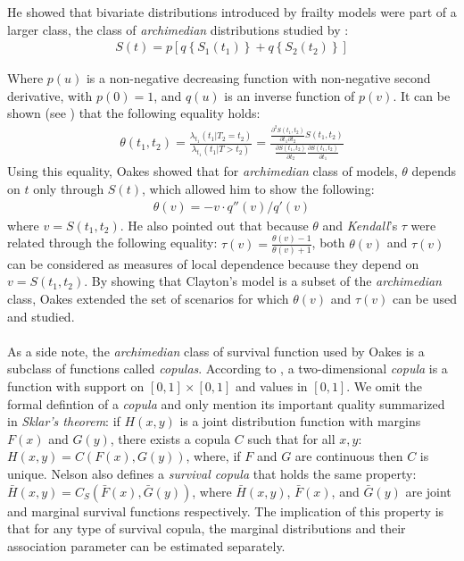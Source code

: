 \documentclass[]{article}
\begin{document}
He showed that bivariate distributions introduced by frailty models were part of a larger class, the class of \emph{archimedian} distributions studied by \cite{genest1986copules}:
$$
\begin{aligned}
	S(t) = p\left[ q\left\{ S_1(t_1) \right\}  + q\left\{ S_2(t_2) \right\}  \right]
\end{aligned}
$$

Where $p(u)$ is a non-negative decreasing function with non-negative second derivative, with $p(0)=1$, and $q(u)$ is an inverse function of $p(v)$. It can be shown (see ) that  the following equality holds:
	$$
	\begin{aligned}
		\theta(t_1,t_2) = \frac{\lambda_{t_1}(t_1|T_2=t_2)}{\lambda_{t_1}(t_1|T>t_2)} = \frac{ \frac{\partial^2 S(t_1,t_2)}{\partial t_1 \partial t_2} S(t_1, t_2)}    {\frac{\partial S(t_1, t_2)}{\partial t_2} \frac{\partial S(t_1, t_2)}{\partial t_1}}
	\end{aligned}
	$$
Using this equality, Oakes showed that for \emph{archimedian} class of models, $\theta$ depends on $t$ only through $S(t)$, which allowed him to show the following:
$$
\begin{aligned}
\theta(v) = -v\cdot q''(v)/q'(v)
\end{aligned}
$$
where $v=S(t_1, t_2)$. He also pointed out that because $\theta$ and \emph{Kendall}'s $\tau$ were related through the following equality: $\tau(v) = \frac{\theta(v)-1}{\theta(v)+1}$, both $\theta(v)$ and $\tau(v)$ can be considered as measures of local dependence because they depend on $v=S(t_1, t_2)$. By showing that Clayton's model is a subset of the \emph{archimedian} class, Oakes extended the set of scenarios for which $\theta(v)$ and $\tau(v)$ can be used and studied.\\
~\\
As a side note, the \emph{archimedian} class of survival function used by Oakes is a subclass of functions called \emph{copulas}. According to \cite{nelsen2007introduction}, a two-dimensional \emph{copula} is a function with support on $[0, 1] \times [0, 1]$ and values in $[0, 1]$. We omit the formal defintion of a \emph{copula} and only mention its important quality summarized in \emph{Sklar's theorem}: if $H(x,y)$ is a joint distribution function with margins $F(x)$ and $G(y)$, there exists a copula $C$ such that for all $x,y$: $H(x,y) = C(F(x), G(y))$, where, if $F$ and $G$ are continuous then $C$ is unique. Nelson also defines a \emph{survival copula} that holds the same property: $\bar{H}(x,y) = C_S(\bar{F}(x), \bar{G}(y))$, where $\bar{H}(x,y)$, $\bar{F}(x)$, and $\bar{G}(y)$ are joint and marginal survival functions respectively. The implication of this property is that for any type of survival copula, the marginal distributions and their association parameter can be estimated separately. 
\end{document}
